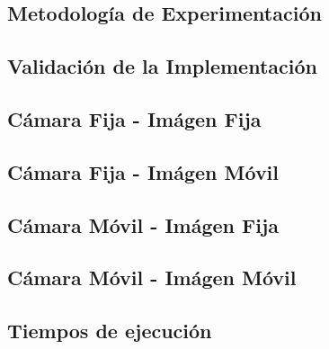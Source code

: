 \subsection{Metodolog\'ia de Experimentaci\'on}\label{subsec:metodologia}


\newpage
\subsection{Validaci\'on de la Implementaci\'on}


\newpage
\subsection{C\'amara Fija - Im\'agen Fija}\label{subsec:fija-fija}


\newpage
\subsection{C\'amara Fija - Im\'agen M\'ovil}


\newpage
\subsection{C\'amara M\'ovil - Im\'agen Fija}\label{subsec:movil-fija}


\newpage
\subsection{C\'amara M\'ovil - Im\'agen M\'ovil}


\newpage
\subsection{Tiempos de ejecuci\'on}



